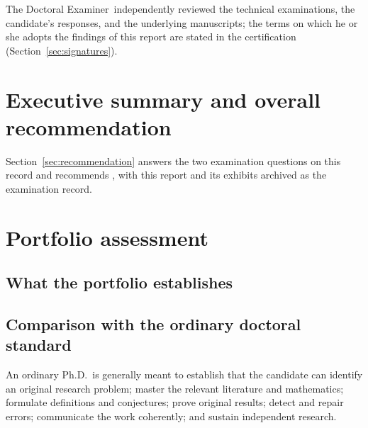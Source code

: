 \documentclass[11pt]{article}
\newcommand{\examinerRole}{Doctoral Examiner}
\newif\ifdraftnotes     \draftnotesfalse     %
\newcommand{\note}[1]{\ifdraftnotes\textcolor{red}{\small[\,#1\,]}\fi}
\begin{document}
The \examinerRole\ independently reviewed the technical examinations, the
candidate's responses, and the underlying manuscripts; the terms on which he or
she adopts the findings of this report are stated in the certification
(Section~\ref{sec:signatures}).

\section{Executive summary and overall recommendation}

\note{Paragraph 1 --- the research program, one sentence per paper.}

\note{Paragraph 2 --- where the examinations located the defects, paper by
paper, and how the candidate responded.}

Section~\ref{sec:recommendation} answers the two examination questions on this
record and recommends \note{outcome}, with this report and its exhibits
archived as the examination record.

\section{Portfolio assessment}\label{sec:portfolio}

\subsection{What the portfolio establishes}

\note{One paragraph per paper: the contribution that survives examination, and
what must be corrected. Close with a sentence on the coherence of the
program: whether each paper arises from an unresolved question in the
preceding work.}

\subsection{Comparison with the ordinary doctoral standard}

An ordinary Ph.D.\ is generally meant to establish that the candidate can
identify an original research problem; master the relevant literature and
mathematics; formulate definitions and conjectures; prove original results;
detect and repair errors; communicate the work coherently; and sustain
independent research. \note{State, with reference to the record, which of
these capacities are evidenced and where. Address the conditions under which
the work was produced (supervision or its absence) and whether they affect the
evidence available or the standard applied.}
\end{document}
